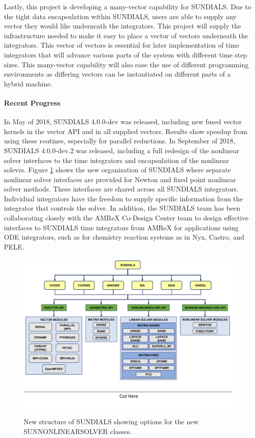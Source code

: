 Lastly, this project is developing a many-vector capability for SUNDIALS.  Due to the tight data encapsulation within SUNDIALS, users are able to supply any vector they would like underneath the integrators.  This project will supply the infrastructure needed to make it easy to place a vector of vectors underneath the integrators.  This vector of vectors is essential for later implementation of time integrators that will advance various parts of the system with different time step sizes.  This many-vector capability will also ease the use of different programming environments as differing vectors can be instantiated on different parts of a hybrid machine. 

\paragraph{Recent Progress}

In May of 2018, SUNDIALS 4.0.0-dev was released, including new fused vector kernels in the vector API and in all supplied vectors.  Results show speedup from using these routines, especially for parallel reductions.  In September of 2018, SUNDIALS 4.0.0-dev.2 was released, including a full redesign of the nonlinear solver interfaces to the time integrators and encapsulation of the nonlinear solevrs.  Figure \ref{fig:sunorg1} shows the new organization of SUNDIALS where separate nonlinear solver interfaces are provided for Newton and fixed point nonlinear solver methods.  These interfaces are shared across all SUNDIALS integrators.  
Individual integrators have the freedom to supply specific information from the integrator that controls the solver.  In addition, the SUNDIALS team has been collaborating closely with the AMReX Co-Design Center team to 
design effective interfaces to SUNDIALS time integrators from AMReX for applications using ODE integrators,
such as for chemistry reaction systems as in Nyx, Castro, and PELE.

\begin{figure}[htb]
	\centering
	\includegraphics[width=6in]{projects/2.3.3-MathLibs/2.3.3.12-SUNDIALS-hypre/sunorg1.pdf}
	\caption{\label{fig:sunorg1}New structure of SUNDIALS showing options for the new SUNNONLINEARSOLVER classes.}
\end{figure}

